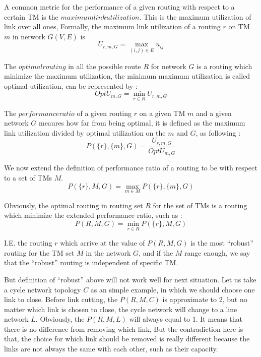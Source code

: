 \documentclass[conference]{IEEEtran}
\begin{document}
A common metric for the performance of a given routing with respect to a certain TM is the $maximum link utilization$.
This is the maximum utilization of link over all ones, Formally, the maximum link utilization of a routing $r$ on 
TM $m$ in network $G(V,E)$ is 
\begin{equation}
	U_{r, m, G} = \max_{(i,j)\in E} u_{ij}
\end{equation}

The $optimal routing$ in all the possible route $R$ for network $G$ is a routing which minimize the maximum utilization,
the minimum maximum utilization is called optimal utilization, can be represented by :
\begin{equation}
	OptU_{m, G} = \min_{r\in R} U_{r, m, G}
\end{equation}

The $performance ratio$ of a given routing $r$ on a given TM $m$ and a given network $G$ meaures how far from being 
optimal, it is defined as the maximum link utilization divided by optimal utilization on the $m$ and $G$, as following : 
\begin{equation}
	P(\{ r \},\{ m \}, G) = \frac{U_{r,m,G}}{OptU_{m,G}}
\end{equation}

We now extend the definition of performance ratio of a routing to be with respect to a set of TMs $M$. 
\begin{equation}
	P(\{ r \}, M, G) = \max_{m\in M} P(\{ r \}, \{ m \}, G)
\end{equation}

Obviously, the optimal routing in routing set $R$ for the set of TMs is a routing which minimize the extended 
performance ratio, such as :
\begin{equation}
	P(R, M, G) = \min_{r\in R} P(\{ r \}, M, G)
\end{equation}

I.E. the routing $r$ which arrive at the value of $P(R,M,G)$ is the most ``robust'' routing for the TM set $M$ 
in the network $G$, and if the $M$ range enough, we say that the ``robust'' routing is independent of specific TM.

But definition of ``robust'' above will not work well for next situation. Let us take a cycle network topology $C$ as 
an simple example, in which we should choose one link to close. Before link cutting, the $P(R, M, C)$ is 
approximate to 2, but no matter which link is chosen to close, the cycle network will change to a line network $L$. 
Obviously, the $P(R, M, L)$ will always equal to 1. It means that there is no difference from removing which link,
But the contradiction here is that, the choice for which link should be removed is really different because the 
links are not always the same with each other, such as their capacity.
\end{document}
